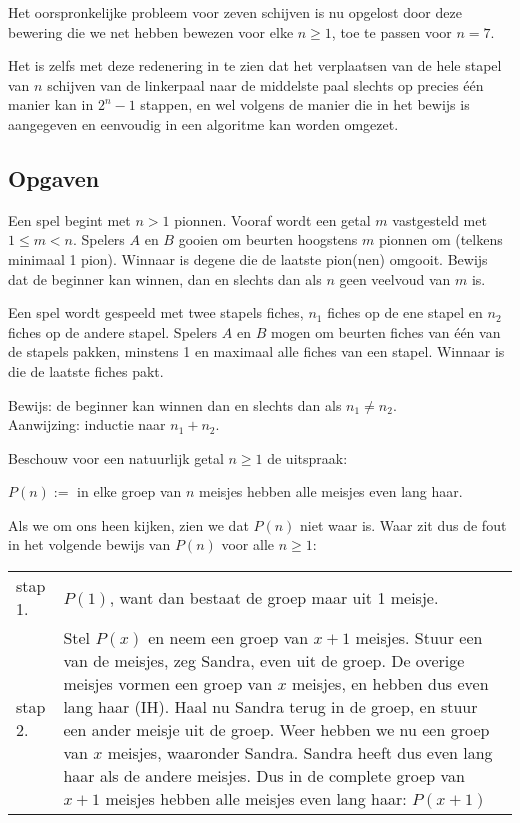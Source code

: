Het oorspronkelijke probleem voor zeven schijven is nu opgelost door deze bewering die we net hebben bewezen voor elke $n\geq 1$, toe te passen voor $n=7$.

Het is zelfs met deze redenering in te zien dat het verplaatsen van de hele stapel van $n$ schijven van de linkerpaal naar de middelste paal slechts op precies \'e\'en manier kan in $2^n-1$ stappen, en wel volgens de manier die in het bewijs is aangegeven en eenvoudig in een algoritme kan worden omgezet.

\subsection{Opgaven}
\begin{exercise}[Optioneel]
Een spel begint met $n>1$ pionnen. Vooraf wordt een getal $m$ vastgesteld met $1\leq m<n$. Spelers $A$ en $B$ gooien om beurten hoogstens $m$ pionnen om (telkens minimaal 1 pion). Winnaar is degene die de laatste pion(nen) omgooit. Bewijs dat de beginner kan winnen, dan en slechts dan als $n$ geen veelvoud van $m$ is.
\end{exercise}

\begin{exercise}[Optioneel]
Een spel wordt gespeeld met twee stapels fiches, $n_1$ fiches op de ene stapel en $n_2$ fiches op de andere stapel. Spelers $A$ en $B$ mogen om beurten fiches van \'e\'en van de stapels pakken, minstens 1 en maximaal alle fiches van een stapel. Winnaar is die de laatste fiches pakt.

Bewijs: de beginner kan winnen dan en slechts dan als $n_1\not =n_2$.\\
Aanwijzing: inductie naar $n_1+n_2$.
\end{exercise}

\begin{exercise}[Optioneel]
Beschouw voor een natuurlijk getal $n\geq 1$ de uitspraak:

\noindent $P(n):=$ in elke groep van $n$ meisjes hebben alle meisjes even lang haar.

Als we om ons heen kijken, zien we dat $P(n)$ niet waar is. Waar zit dus de fout in het volgende bewijs van $P(n)$ voor alle $n\geq 1$:

\noindent\begin{tabular}{lp{}}
stap 1. & $P(1)$, want dan bestaat de groep maar uit 1 meisje.\\
stap 2. & Stel $P(x)$ en neem een groep van $x+1$ meisjes. Stuur een van de meisjes, zeg Sandra, even uit de groep. De overige meisjes vormen een groep van $x$ meisjes, en hebben dus even lang haar (IH). Haal nu Sandra terug in de groep, en stuur een ander meisje uit de groep. Weer hebben we nu een groep van $x$ meisjes, waaronder Sandra. Sandra heeft dus even lang haar als de andere meisjes. Dus in de complete groep van $x+1$ meisjes hebben alle meisjes even lang haar: $P(x+1)$
\end{tabular}
\end{exercise}

